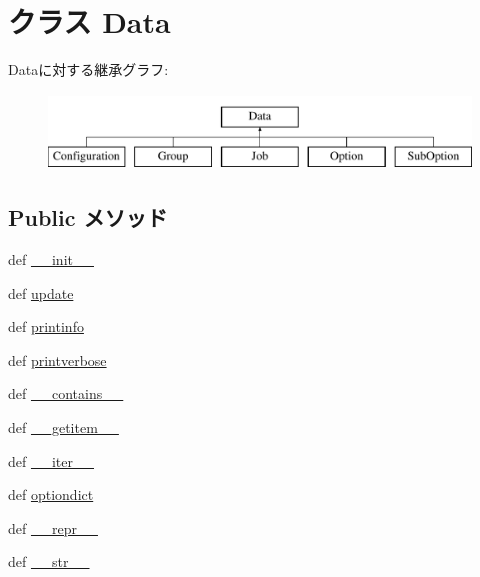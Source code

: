 \hypertarget{classm5_1_1util_1_1jobfile_1_1Data}{
\section{クラス Data}
\label{classm5_1_1util_1_1jobfile_1_1Data}
}
Dataに対する継承グラフ:\begin{figure}[H]
\begin{center}
\leavevmode
\includegraphics[height=2cm]{classm5_1_1util_1_1jobfile_1_1Data}
\end{center}
\end{figure}
\subsection*{Public メソッド}
\begin{DoxyCompactItemize}
\item 
def \hyperlink{classm5_1_1util_1_1jobfile_1_1Data_ac775ee34451fdfa742b318538164070e}{\_\-\_\-init\_\-\_\-}
\item 
def \hyperlink{classm5_1_1util_1_1jobfile_1_1Data_abe52b977c101e59f342489ed18140819}{update}
\item 
def \hyperlink{classm5_1_1util_1_1jobfile_1_1Data_a40bc1aa85be1c4ba18cd144234c53984}{printinfo}
\item 
def \hyperlink{classm5_1_1util_1_1jobfile_1_1Data_ad0eb102892682fd4530443de1a21b627}{printverbose}
\item 
def \hyperlink{classm5_1_1util_1_1jobfile_1_1Data_a31ecdf34e79a47aea99a17eea32b7ac2}{\_\-\_\-contains\_\-\_\-}
\item 
def \hyperlink{classm5_1_1util_1_1jobfile_1_1Data_a50d766f4276c3d8fe330ac8cd344a75f}{\_\-\_\-getitem\_\-\_\-}
\item 
def \hyperlink{classm5_1_1util_1_1jobfile_1_1Data_a3009f152864dea4eb5e89cd94143d563}{\_\-\_\-iter\_\-\_\-}
\item 
def \hyperlink{classm5_1_1util_1_1jobfile_1_1Data_af5dee8788a100a9aad357e9616a44276}{optiondict}
\item 
def \hyperlink{classm5_1_1util_1_1jobfile_1_1Data_ad8b9328939df072e4740cd9a63189744}{\_\-\_\-repr\_\-\_\-}
\item 
def \hyperlink{classm5_1_1util_1_1jobfile_1_1Data_aa7a4b9bc0941308e362738503137460e}{\_\-\_\-str\_\-\_\-}
\end{DoxyCompactItemize}
